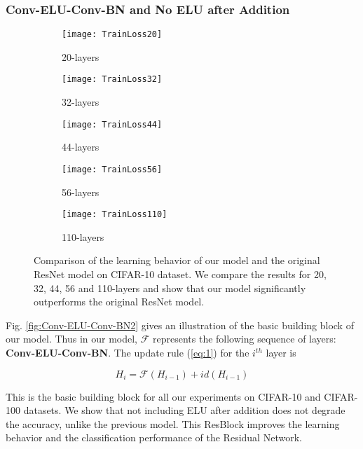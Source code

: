 \documentclass[10pt,twocolumn,letterpaper]{article}
\begin{document}
\subsubsection{Conv-ELU-Conv-BN and No ELU after Addition}

\begin{figure*}
    \centering
    \begin{subfigure}{.33\linewidth}
        \centering
        \texttt{[image: TrainLoss20]}
        \caption{20-layers}
        \label{fig:Cifar10TrainLoss20}
    \end{subfigure}
    \begin{subfigure}{.33\linewidth}
        \centering
        \texttt{[image: TrainLoss32]}
        \caption{32-layers}
        \label{fig:Cifar10TrainLoss32}
    \end{subfigure}
    \begin{subfigure}{.33\linewidth}
        \centering
        \texttt{[image: TrainLoss44]}
        \caption{44-layers}
        \label{fig:Cifar10TrainLoss44}
    \end{subfigure}
    \begin{subfigure}{.4\linewidth}
        \centering
        \texttt{[image: TrainLoss56]}
        \caption{56-layers}
        \label{fig:Cifar10TrainLoss56}
    \end{subfigure}
    \begin{subfigure}{.4\linewidth}
        \centering
        \texttt{[image: TrainLoss110]}
        \caption{110-layers}
        \label{fig:Cifar10TrainLoss110}
    \end{subfigure}
    \caption{Comparison of the learning behavior of our model and the original ResNet model on CIFAR-10 dataset. We compare the results for 20, 32, 44, 56 and 110-layers and show that our model significantly outperforms the original ResNet model.}
    \label{fig:Cifar10TrainLoss}
\end{figure*}

Fig. \ref{fig:Conv-ELU-Conv-BN2} gives an illustration of the basic building block of our model. Thus in our model, \(\mathcal{F}\) represents the following sequence of layers: \textbf{Conv-ELU-Conv-BN}. The update rule (\ref{eq:1}) for the \(i^{th}\) layer is

\begin{equation} \label{eq:2}
 H_i = \mathcal{F}(H_{i-1}) + id(H_{i-1})
\end{equation}

This is the basic building block for all our experiments on CIFAR-10 and CIFAR-100 datasets. We show that not including ELU after addition does not degrade the accuracy, unlike the previous model. This ResBlock improves the learning behavior and the classification performance of the Residual Network.
\end{document}
